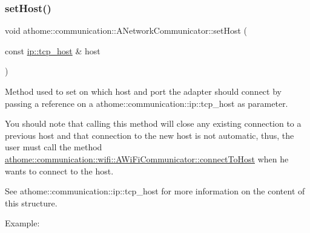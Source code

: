 \subsubsection{\texorpdfstring{set\+Host()}{setHost()}}
{\footnotesize\ttfamily void athome\+::communication\+::\+A\+Network\+Communicator\+::set\+Host (\begin{DoxyParamCaption}\item[{const \mbox{\hyperlink{structathome_1_1communication_1_1ip_1_1s__host}{ip\+::tcp\+\_\+host}} \&}]{host }\end{DoxyParamCaption})}

Method used to set on which host and port the adapter should connect by passing a reference on a athome\+::communication\+::ip\+::tcp\+\_\+host as parameter.

You should note that calling this method will close any existing connection to a previous host and that connection to the new host is not automatic, thus, the user must call the method \mbox{\hyperlink{classathome_1_1communication_1_1_a_network_communicator_a370176dae8f38225446e83a132dbcff7}{athome\+::communication\+::wifi\+::\+A\+Wi\+Fi\+Communicator\+::connect\+To\+Host}} when he wants to connect to the host.

See athome\+::communication\+::ip\+::tcp\+\_\+host for more information on the content of this structure.

Example\+:


